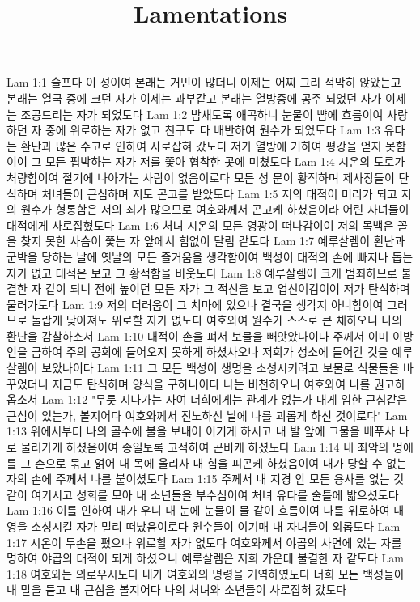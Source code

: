 

\title{Lamentations}

Lam 1:1  슬프다 이 성이여 본래는 거민이 많더니 이제는 어찌 그리 적막히 앉았는고 본래는 열국 중에 크던 자가 이제는 과부같고 본래는 열방중에 공주 되었던 자가 이제는 조공드리는 자가 되었도다
Lam 1:2  밤새도록 애곡하니 눈물이 뺨에 흐름이여 사랑하던 자 중에 위로하는 자가 없고 친구도 다 배반하여 원수가 되었도다
Lam 1:3  유다는 환난과 많은 수고로 인하여 사로잡혀 갔도다 저가 열방에 거하여 평강을 얻지 못함이여 그 모든 핍박하는 자가 저를 쫓아 협착한 곳에 미쳤도다
Lam 1:4  시온의 도로가 처량함이여 절기에 나아가는 사람이 없음이로다 모든 성 문이 황적하며 제사장들이 탄식하며 처녀들이 근심하며 저도 곤고를 받았도다
Lam 1:5  저의 대적이 머리가 되고 저의 원수가 형통함은 저의 죄가 많으므로 여호와께서 곤고케 하셨음이라 어린 자녀들이 대적에게 사로잡혔도다
Lam 1:6  처녀 시온의 모든 영광이 떠나감이여 저의 목백은 꼴을 찾지 못한 사슴이 쫓는 자 앞에서 힘없이 달림 같도다
Lam 1:7  예루살렘이 환난과 군박을 당하는 날에 옛날의 모든 즐거움을 생각함이여 백성이 대적의 손에 빠지나 돕는 자가 없고 대적은 보고 그 황적함을 비웃도다
Lam 1:8  예루살렘이 크게 범죄하므로 불결한 자 같이 되니 전에 높이던 모든 자가 그 적신을 보고 업신여김이여 저가 탄식하며 물러가도다
Lam 1:9  저의 더러움이 그 치마에 있으나 결국을 생각지 아니함이여 그러므로 놀랍게 낮아져도 위로할 자가 없도다 여호와여 원수가 스스로 큰 체하오니 나의 환난을 감찰하소서
Lam 1:10  대적이 손을 펴서 보물을 빼앗았나이다 주께서 이미 이방인을 금하여 주의 공회에 들어오지 못하게 하셨사오나 저희가 성소에 들어간 것을 예루살렘이 보았나이다
Lam 1:11  그 모든 백성이 생명을 소성시키려고 보물로 식물들을 바꾸었더니 지금도 탄식하며 양식을 구하나이다 나는 비천하오니 여호와여 나를 권고하옵소서
Lam 1:12  "무릇 지나가는 자여 너희에게는 관계가 없는가 내게 임한 근심같은 근심이 있는가, 볼지어다 여호와께서 진노하신 날에 나를 괴롭게 하신 것이로다"
Lam 1:13  위에서부터 나의 골수에 불을 보내어 이기게 하시고 내 발 앞에 그물을 베푸사 나로 물러가게 하셨음이여 종일토록 고적하여 곤비케 하셨도다
Lam 1:14  내 죄악의 멍에를 그 손으로 묶고 얽어 내 목에 올리사 내 힘을 피곤케 하셨음이여 내가 당할 수 없는 자의 손에 주께서 나를 붙이셨도다
Lam 1:15  주께서 내 지경 안 모든 용사를 없는 것 같이 여기시고 성회를 모아 내 소년들을 부수심이여 처녀 유다를 술틀에 밟으셨도다
Lam 1:16  이를 인하여 내가 우니 내 눈에 눈물이 물 같이 흐름이여 나를 위로하여 내 영을 소성시킬 자가 멀리 떠났음이로다 원수들이 이기매 내 자녀들이 외롭도다
Lam 1:17  시온이 두손을 폈으나 위로할 자가 없도다 여호와께서 야곱의 사면에 있는 자를 명하여 야곱의 대적이 되게 하셨으니 예루살렘은 저희 가운데 불결한 자 같도다
Lam 1:18  여호와는 의로우시도다 내가 여호와의 명령을 거역하였도다 너희 모든 백성들아 내 말을 듣고 내 근심을 볼지어다 나의 처녀와 소년들이 사로잡혀 갔도다
